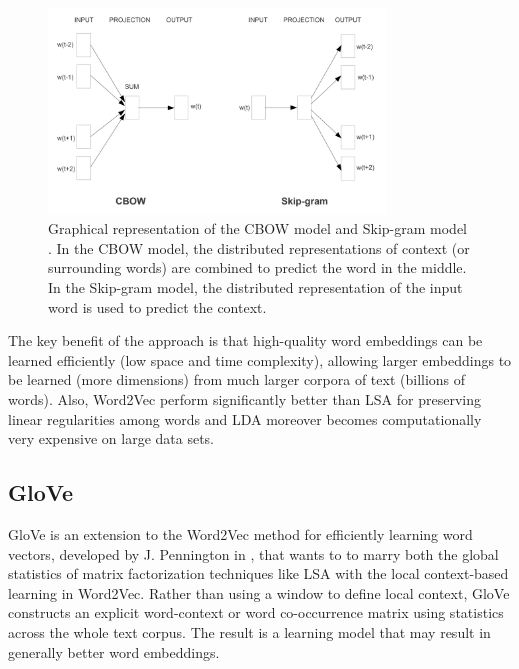 \begin{figure}
  \centering
  \includegraphics[width=0.8\textwidth]{figures/word2vec-training-models.png}
  \caption[Graphical representation of the CBOW model and Skip-gram model]{
    Graphical representation of the CBOW model and Skip-gram model
    \cite{mikolov2013exploiting}. In the CBOW model, the distributed
    representations of context (or surrounding words) are combined to
    predict the word in the middle. In the Skip-gram model, the
    distributed representation of the input word is used to predict
    the context.
  }
  \label{fig:word2vec-learning-models}
\end{figure}

The key benefit of the approach is that high-quality word embeddings
can be learned efficiently (low space and time complexity), allowing
larger embeddings to be learned (more dimensions) from much larger
corpora of text (billions of words). Also, Word2Vec perform
significantly better than LSA for preserving linear regularities among
words and LDA moreover becomes computationally very expensive on
large data sets.

\subsection{GloVe}

GloVe is an extension to the Word2Vec method for efficiently learning
word vectors, developed by J. Pennington \etal{} in
\cite{pennington2014glove}, that wants to to marry both the global
statistics of matrix factorization techniques like LSA with the local
context-based learning in Word2Vec. Rather than using a window to
define local context, GloVe constructs an explicit word-context or
word co-occurrence matrix using statistics across the whole text
corpus. The result is a learning model that may result in generally
better word embeddings.

